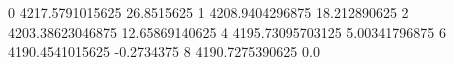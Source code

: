 0 4217.5791015625 26.8515625
1 4208.9404296875 18.212890625
2 4203.38623046875 12.65869140625
4 4195.73095703125 5.00341796875
6 4190.4541015625 -0.2734375
8 4190.7275390625 0.0
